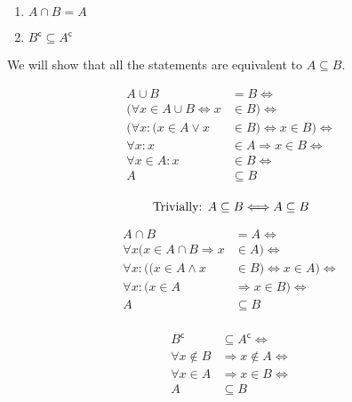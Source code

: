 \documentclass[10pt,\jkfside,a4paper]{article}
\begin{document}
\begin{enumerate}
\begin{multicols}{4}
\begin{enumerate}
\item $A \cap B = A$

\item $B^\mathsf{c} \subseteq A^\mathsf{c}$

\end{enumerate}

\end{multicols}

We will show that all the statements are equivalent to $A \subseteq B$.

\begin{equation}
\begin{split}
A \cup B &= B \Longleftrightarrow\\
(\forall x \in A \cup B \Longleftrightarrow x &\in B) \Longleftrightarrow\\
(\forall x : (x \in A \vee x &\in B) \Longleftrightarrow x \in B) \Longleftrightarrow\\
\forall x : x &\in A \Longrightarrow x \in B \Longleftrightarrow\\
\forall x \in A: x &\in B \Longleftrightarrow\\
A &\subseteq B\\
\end{split}
\end{equation}

\begin{equation}
\text{Trivially: } A \subseteq B \Longleftrightarrow A \subseteq B\\
\end{equation}

\begin{equation}
\begin{split}
A \cap B &= A \Longleftrightarrow\\
\forall x (x \in A \cap B \Longrightarrow x &\in A) \Longleftrightarrow\\
\forall x : ((x \in A \wedge x &\in B) \Longleftrightarrow x \in A) \Longleftrightarrow\\
\forall x: (x \in A &\Longrightarrow x \in B) \Longleftrightarrow\\
A &\subseteq B\\
\end{split}
\end{equation}

\begin{equation}
\begin{split}
B^{\mathsf{c}} &\subseteq A^{\mathsf{c}} \Longleftrightarrow\\
\forall x \notin B &\Longrightarrow x \notin A \Longleftrightarrow\\
\forall x \in A &\Longrightarrow x \in B \Longleftrightarrow\\
A &\subseteq B\\
\end{split}
\end{equation}


\end{enumerate}
\end{document}
